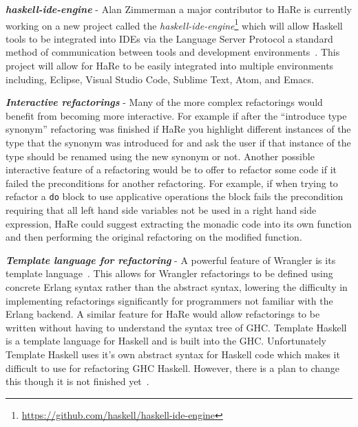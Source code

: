 \textit{\textbf{haskell-ide-engine}} - Alan Zimmerman a major contributor to HaRe is currently working on a new project called the \textit{haskell-ide-engine}\footnote{\url{https://github.com/haskell/haskell-ide-engine}} which will allow Haskell tools to be integrated into IDEs via the Language Server Protocol a standard method of communication between tools and development environments~\citep{lsp}. This project will allow for HaRe to be easily integrated into multiple environments including, Eclipse, Visual Studio Code, Sublime Text, Atom, and Emacs.

\textit{\textbf{Interactive refactorings}} - Many of the more complex refactorings would benefit from becoming more interactive. For example if after the ``introduce type synonym'' refactoring was finished if HaRe you highlight different instances of the type that the synonym was introduced for and ask the user if that instance of the type should be renamed using the new synonym or not. Another possible interactive feature of a refactoring would be to offer to refactor some code if it failed the preconditions for another refactoring. For example, if when trying to refactor a \texttt{do} block to use applicative operations the block fails the precondition requiring that all left hand side variables not be used in a right hand side expression, HaRe could suggest extracting the monadic code into its own function and then performing the original refactoring on the modified function.

\textit{\textbf{Template language for refactoring}} - A powerful feature of Wrangler is its template language~\citep{letsUser}. This allows for Wrangler refactorings to be defined using concrete Erlang syntax rather than the abstract syntax, lowering the difficulty in implementing refactorings significantly for programmers not familiar with the Erlang backend. A similar feature for HaRe would allow refactorings to be written without having to understand the syntax tree of GHC. Template Haskell is a template language for Haskell and is built into the GHC. Unfortunately Template Haskell uses it's own abstract syntax for Haskell code which makes it difficult to use for refactoring GHC Haskell. However, there is a plan to change this though it is not finished yet~\citep{ghcTreesGrow}.



\cleardoublepage
{}
\label{index}
\printindex


